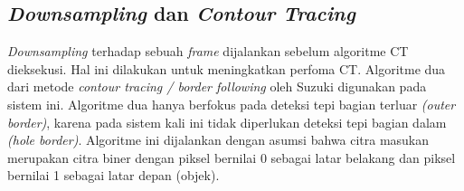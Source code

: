     \subsection{\textit{Downsampling} dan \textit{Contour Tracing}}
        \textit{Downsampling} terhadap sebuah \textit{frame} dijalankan sebelum algoritme CT dieksekusi. Hal ini dilakukan untuk meningkatkan perfoma CT. Algoritme dua dari metode \textit{contour tracing / border following} oleh Suzuki digunakan pada sistem ini. Algoritme dua hanya berfokus pada deteksi tepi bagian terluar \textit{(outer border)}, karena pada sistem kali ini tidak diperlukan deteksi tepi bagian dalam \textit{(hole border)}. Algoritme ini dijalankan dengan asumsi bahwa citra masukan merupakan citra biner dengan piksel bernilai 0 sebagai latar belakang dan piksel bernilai 1 sebagai latar depan (objek).
        
